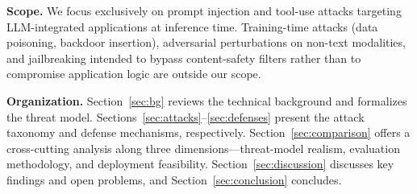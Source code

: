 \textbf{Scope.} We focus exclusively on prompt injection and tool-use attacks targeting LLM-integrated applications at inference time. Training-time attacks (data poisoning, backdoor insertion), adversarial perturbations on non-text modalities, and jailbreaking intended to bypass content-safety filters rather than to compromise application logic are outside our scope.

\textbf{Organization.} Section~\ref{sec:bg} reviews the technical background and formalizes the threat model. Sections~\ref{sec:attacks}--\ref{sec:defenses} present the attack taxonomy and defense mechanisms, respectively. Section~\ref{sec:comparison} offers a cross-cutting analysis along three dimensions---threat-model realism, evaluation methodology, and deployment feasibility. Section~\ref{sec:discussion} discusses key findings and open problems, and Section~\ref{sec:conclusion} concludes.
